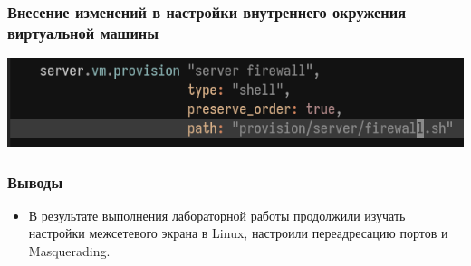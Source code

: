 \begin{frame}
\frametitle{Внесение изменений в настройки внутреннего окружения виртуальной машины}
    \includegraphics[width=\textwidth]{../images/image13.png}
\end{frame}



\begin{frame}
\frametitle{Выводы}
\begin{itemize}
    \item В результате выполнения лабораторной работы продолжили изучать настройки межсетевого экрана в Linux, настроили переадресацию портов и Masquerading.
\end{itemize}
\end{frame}

